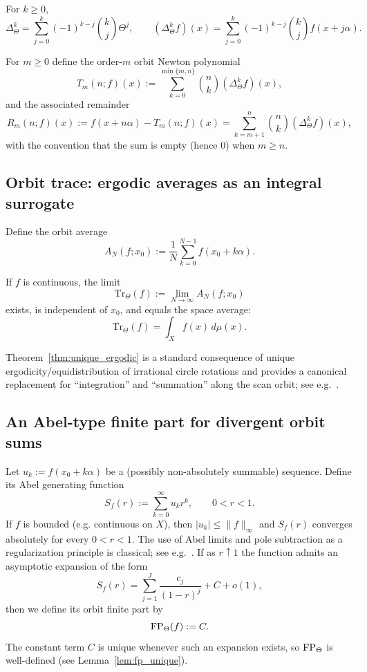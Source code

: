 \begin{remark}
\label{rem:orbit_kth_difference}
For $k\ge 0$,
$$
\Delta_\Theta^k=\sum_{j=0}^{k}(-1)^{k-j}\binom{k}{j}\Theta^{j},
\qquad
(\Delta_\Theta^k f)(x)=\sum_{j=0}^{k}(-1)^{k-j}\binom{k}{j}f(x+j\alpha).
$$
\end{remark}

\begin{definition}
\label{def:orbit_newton_remainder}
For $m\ge 0$ define the order-$m$ orbit Newton polynomial
$$
T_m(n;f)(x):=\sum_{k=0}^{\min\{m,n\}}\binom{n}{k}(\Delta_\Theta^k f)(x),
$$
and the associated remainder
$$
R_m(n;f)(x):=f(x+n\alpha)-T_m(n;f)(x)=\sum_{k=m+1}^{n}\binom{n}{k}(\Delta_\Theta^k f)(x),
$$
with the convention that the sum is empty (hence $0$) when $m\ge n$.
\end{definition}

\subsection{Orbit trace: ergodic averages as an integral surrogate}
Define the orbit average
$$
A_N(f;x_0):=\frac{1}{N}\sum_{k=0}^{N-1} f(x_0+k\alpha).
$$

\begin{theorem}
\label{thm:unique_ergodic}
If $f$ is continuous, the limit
$$
\mathrm{Tr}_\Theta(f):=\lim_{N\to\infty} A_N(f;x_0)
$$
exists, is independent of $x_0$, and equals the space average:
$$
\mathrm{Tr}_\Theta(f)=\int_X f(x)\,d\mu(x).
$$
\end{theorem}

Theorem~\ref{thm:unique_ergodic} is a standard consequence of unique ergodicity/equidistribution of irrational circle rotations and provides a canonical replacement for ``integration'' and ``summation'' along the scan orbit; see e.g.~\cite{Weyl1916,KuipersNiederreiter1974}.

\subsection{An Abel-type finite part for divergent orbit sums}
\label{subsec:abel_fp}
Let $u_k:=f(x_0+k\alpha)$ be a (possibly non-absolutely summable) sequence. Define its Abel generating function
$$
S_f(r):=\sum_{k=0}^{\infty} u_k r^k,\qquad 0<r<1.
$$
If $f$ is bounded (e.g. continuous on $X$), then $|u_k|\le \|f\|_\infty$ and $S_f(r)$ converges absolutely for every $0<r<1$. The use of Abel limits and pole subtraction as a regularization principle is classical; see e.g.~\cite{Hardy1949}.
If as $r\uparrow 1$ the function admits an asymptotic expansion of the form
$$
S_f(r)=\sum_{j=1}^{J} \frac{c_j}{(1-r)^j} + C + o(1),
$$
then we define its orbit finite part by
$$
\mathrm{FP}_\Theta(f):=C.
$$
The constant term $C$ is unique whenever such an expansion exists, so $\mathrm{FP}_\Theta$ is well-defined (see Lemma~\ref{lem:fp_unique}).

